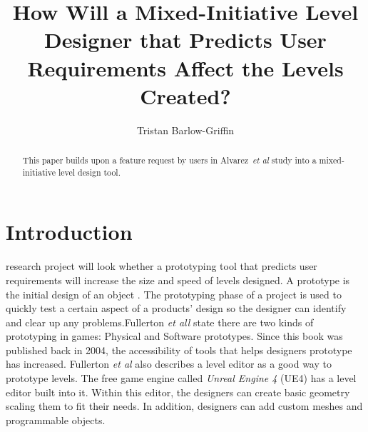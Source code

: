 \documentclass[journal]{IEEEtran}
\begin{document}
%
\title{ How Will a Mixed-Initiative Level Designer that Predicts User Requirements Affect the Levels Created?}
%
%

\author{Tristan Barlow-Griffin}


\maketitle

\begin{abstract}
This paper builds upon a feature request by users in Alvarez~\textit{et al}\cite{alvarez2018fostering} study into a mixed-initiative level design tool. 
\end{abstract}





\section{Introduction} \label{intro}
 research project will look whether a prototyping tool that predicts user requirements will increase the size and speed of levels designed. A prototype is the initial design of an object \cite{prototype}. The prototyping phase of a project is used to quickly test a certain aspect of a products' design so the designer can identify and clear up any problems\cite{budde1992prototyping}.Fullerton \textit{et all} \cite[p.~150]{fullerton2004game} state there are two kinds of prototyping in games: Physical and Software prototypes. Since this book was published back in 2004, the accessibility of tools that helps designers prototype has increased. Fullerton \textit{et al} \cite[p.~164]{fullerton2004game} also describes a level editor as a good way to prototype levels.  The free game engine called \textit{Unreal Engine 4} (UE4) has a level editor built into it. Within this editor, the designers can create basic geometry scaling them to fit their needs. In addition, designers can add custom meshes and programmable objects.
\end{document}
